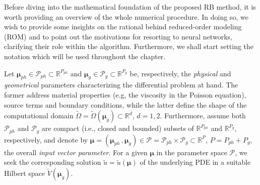 \documentclass[12pt, a4paper, twoside, openright, notitlepage]{report}
\numberwithin{equation}{chapter}
\theoremstyle{theorem}
\theoremstyle{definition}
\theoremstyle{remark}
\theoremstyle{proposition}
\numberwithin{figure}{chapter}
\newcommand{\wt}[1]{\widetilde{#1}}
\begin{document}
		Before diving into the mathematical foundation of the proposed RB method, it is worth providing an overview of the whole numerical procedure. In doing so, we wish to provide some insights on the rational behind reduced-order modeling (ROM) and to point out the motivations for resorting to neural networks, clarifying their role within the algorithm. Furthermore, we shall start setting the notation which will be used throughout the chapter.
		
		Let $\boldsymbol{\mu}_{ph} \in \mathcal{P}_{ph} \subset \mathbb{R}^{P_{ph}}$ and $\boldsymbol{\mu}_{g} \in \mathcal{P}_{g} \subset \mathbb{R}^{P_{g}}$ be, respectively, the \emph{physical} and \emph{geometrical} parameters characterizing the differential problem at hand. The former address material properties (e.g, the viscosity in the Poisson equation), source terms and boundary conditions, while the latter define the shape of the computational domain $\wt{\Omega} = \wt{\Omega}(\boldsymbol{\mu}_g) \subset \mathbb{R}^d$, $d = 1,2$. Furthermore, assume both $\mathcal{P}_{ph}$ and $\mathcal{P}_g$ are compact (i.e., closed and bounded) subsets of  $\mathbb{R}^{P_{ph}}$ and $\mathbb{R}^{P_{g}}$, respectively, and denote by $\boldsymbol{\mu} = (\boldsymbol{\mu}_{ph} \, , \boldsymbol{\mu}_{g}) \in \mathcal{P} = \mathcal{P}_{ph} \times \mathcal{P}_g \subset \mathbb{R}^P$, $P = P_{ph} + P_g$, the overall \emph{input vector parameter}. For a given $\boldsymbol{\mu}$ in the parameter space $\mathcal{P}$, we seek the corresponding solution $\wt{u} = \wt{u}(\boldsymbol{\mu})$ of the underlying PDE in a suitable Hilbert space $\wt{V}(\boldsymbol{\mu}_g)$.
		
\end{document}
